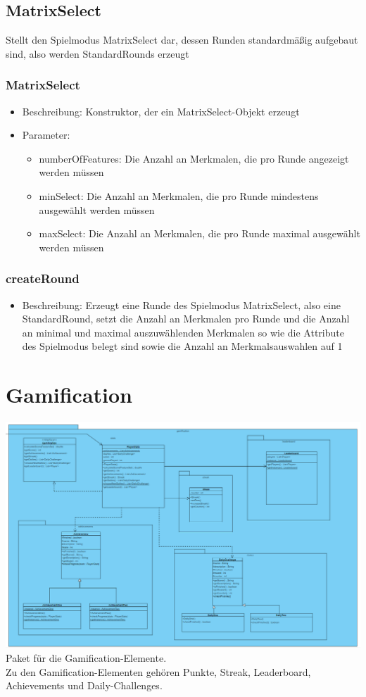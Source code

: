 \documentclass[a4paper]{scrreprt}
\begin{document}
	\subsection{MatrixSelect}
	Stellt den Spielmodus MatrixSelect dar, dessen Runden standardmäßig aufgebaut sind, also werden StandardRounds erzeugt
	\subsubsection{MatrixSelect}
	\begin{itemize}
		\item Beschreibung: Konstruktor, der ein MatrixSelect-Objekt erzeugt
		\item Parameter:
		\begin{itemize}
			\item numberOfFeatures: Die Anzahl an Merkmalen, die pro Runde angezeigt werden müssen
			\item minSelect: Die Anzahl an Merkmalen, die pro Runde mindestens ausgewählt werden müssen
			\item maxSelect: Die Anzahl an Merkmalen, die pro Runde maximal ausgewählt werden müssen
		\end{itemize}
	\end{itemize}
	\subsubsection{createRound}
	\begin{itemize}
		\item Beschreibung: Erzeugt eine Runde des Spielmodus MatrixSelect, also eine StandardRound, setzt die Anzahl an Merkmalen pro Runde und die Anzahl an minimal und maximal auszuwählenden Merkmalen so wie die Attribute des Spielmodus belegt sind sowie die Anzahl an Merkmalsauswahlen auf 1
	\end{itemize}


	\section{Gamification}
	\includegraphics[width=\textwidth]{img/Gamification.PNG}\\
	Paket für die Gamification-Elemente. \\
	Zu den Gamification-Elementen gehören Punkte, Streak, Leaderboard, Achievements und Daily-Challenges.
\end{document}
